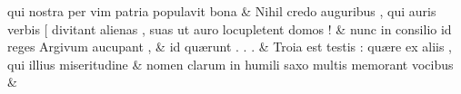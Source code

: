 \documentclass[12pt,onecolumn,twoside,a4paper]{memoir}
\begin{document}
               \begin{pairs}
                  \begin{Leftside}
			\beginnumbering
			\setcounter{stanzaL}{0}
                     
                         \stanza {}
                     qui
                              nostra
                              per
                              vim
                              patria
                              populavit
                              bona \&
                         \stanza {}
                     Nihil
                              credo
                              auguribus
                              ,
                              qui
                              auris
                              verbis
                              [
                              divitant
                              alienas
                              ,
                              suas
                              ut
                              auro
                              locupletent
                              domos
                              ! \&
                         \stanza {}nunc
                              in
                              consilio
                              id
                              reges
                              Argivum
                              aucupant
                              , & 
                     id
                              quærunt
                              .
                              .
                              . \&
                         \stanza {}Troia
                              est
                              testis
                              :
                              quære
                              ex
                              aliis
                              ,
                              qui
                              illius
                              miseritudine & 
                     nomen
                              clarum
                              in
                              humili
                              saxo
                              multis
                              memorant
                              vocibus \&
                         \stanza {}
                     

\end{Leftside}
\end{pairs}
\end{document}
